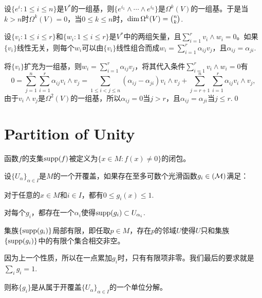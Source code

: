 \para 设$\{e^i:1\leq i \leq n\}$是$V^*$的一组基，则$\{e^{i_1}\wedge \cdots \wedge e^{i_k}\}$是$\Omega^k(V)$的一组基。于是当$k>n$时$\Omega^k(V)=0$，当$0\leq k \leq n$时，$\dim \Omega^k(V)=\tbinom nk$.

\begin{lem}[Cartan引理]
设$\{v_i:1\leq i \leq r\}$和$\{w_i:1\leq i \leq r\}$是$V^*$中的两组矢量，且$\sum_{i=1}^rv_i\wedge w_i=0$。如果$\{v_i\}$线性无关，则每个$w_i$可以由$\{v_i\}$线性组合而成$w_i=\sum_{i=1}^r\alpha_{ij}v_j$，且$\alpha_{ij}=\alpha_{ji}$.
\end{lem}

\proof
	将$\{v_i\}$扩充为一组基，则$w_i=\sum_{i=1}^r\alpha_{ij}v_j$，将其代入条件$\sum_{i=1}^rv_i\wedge w_i=0$有
	\[
		0=\sum_{j=1}^n\sum_{i=1}^r \alpha_{ij}v_i \wedge v_j=\sum_{1\leq i < j \leq n}(\alpha_{ij}-\alpha_{ji}) v_i \wedge v_j+\sum_{j=r+1}^n\sum_{i=1}^r \alpha_{ij}v_i \wedge v_j,
	\]
	由于$v_i \wedge v_j$是$\Omega^2(V)$的一组基，所以$\alpha_{ij}=0$当$j>r$，且$\alpha_{ij}=\alpha_{ji}$当$j\leq r$.\qed


\chapter{Partition of Unity}

函数$f$的支集$\operatorname{supp}(f)$被定义为$\{x\in M:f(x)\neq 0\}$的闭包。

\begin{para}[单位分解]\label{POUdef}
设$\{U_\alpha\}_{\alpha\in I}$是$M$的一个开覆盖，如果存在至多可数个光滑函数$g_i\in \cal(M)$满足：

\begin{compactenum}[\quad (1)]
\item 对于任意的$x\in M$和$i\in I$，都有$0\leq g_i(x)\leq 1$.
\item 对每个$g_i$，都存在一个${\alpha_i}$使得$\operatorname{supp}(g_i)\subset U_{\alpha_i}$.
\item 集族$\{\operatorname{supp}(g_i)\}$局部有限，即任取$p\in M$，存在$p$的邻域$U$使得$U$只和集族$\{\operatorname{supp}(g_i)\}$中的有限个集合相交非空。
\item 因为上一个性质，所以在一点累加$g_i$时，只有有限项非零。我们最后的要求就是$\sum_i g_i=1$.
\end{compactenum}
则称$\{g_i\}$是从属于开覆盖$\{U_\alpha\}_{\alpha\in I}$的一个单位分解。
\end{para}

